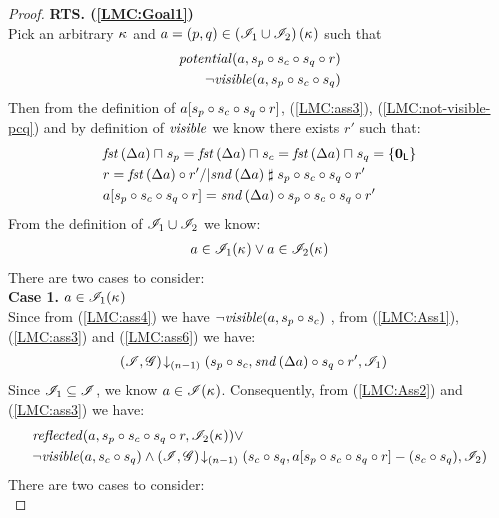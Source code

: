 \begin{lemma}
\begin{proof}
\noindent\textbf{RTS. (\ref{LMC:Goal1})}\\
Pick an arbitrary $\kappa_{}$ and $a = (p, q) \in \left(\mathscr{I}_{1} \cup \mathscr{I}_{2} \right)(\kappa_{})$ such that
\begin{align}
	\mathit{potential}(a, s_p \circ s_c \circ s_q \circ r) \label{LMC:ass3}\\
	\neg\mathit{visible}(a, s_p \circ s_c \circ s_q) \label{LMC:not-visible-pcq}
\end{align}
%
Then from the definition of $a[s_p \circ s_c \circ s_q \circ r]$, (\ref{LMC:ass3}), (\ref{LMC:not-visible-pcq}) and by definition of $\mathit{visible}$ we know there exists $r'$ such that: 
%
\begin{align}
		&\mathit{fst}\left(\Delta {a}\right) \sqcap_{} s_p = \mathit{fst}\left(\Delta {a}\right) \sqcap_{} s_c = \mathit{fst}\left(\Delta {a}\right) \sqcap_{} s_q = \{\mathbf{0}_{\textsf{L}} \} \label{LMC:ass4}\\
		&r = \mathit{fst}\left(\Delta {a}\right) \circ r' /| \mathit{snd}\left(\Delta {a}\right) \mathrel{\sharp} s_p \circ s_c \circ s_q \circ r' \label{LMC:ass5}\\
		&a[s_p \circ s_c \circ s_q \circ r] = \mathit{snd}\left(\Delta {a}\right) \circ s_p \circ s_c \circ s_q \circ r' \label{LMC:ass6}
\end{align}
%
From the definition of $\mathscr{I}_{1} \cup \mathscr{I}_{2}$ we know:
%
\begin{align}
	a \in \mathscr{I}_{1}(\kappa_{}) \lor a \in \mathscr{I}_{2}(\kappa_{}) \nonumber
\end{align}
There are two cases to consider:\\

\noindent\textbf{Case 1.} $a \in \mathscr{I}_{1}(\kappa_{})$\\
Since from  (\ref{LMC:ass4}) we have $\neg\mathit{visible}(a, s_p \circ s_c)$ , from (\ref{LMC:Ass1}),  (\ref{LMC:ass3}) and (\ref{LMC:ass6}) we have: 
%
\begin{align}
	& \left(\mathscr{I}, \mathscr{G}\right) \!\downarrow_{(n-1)} \left(s_{p} \circ s_{c}, \mathit{snd}\left(\Delta {a}\right) \circ  s_q \circ r', \mathscr{I}_1\right) \label{LMC:ass7}
\end{align}
%
Since $\mathscr{I}_{1} \subseteq \mathscr{I}$, we know $a \in \mathscr{I}(\kappa_{})$. Consequently, from (\ref{LMC:Ass2}) and (\ref{LMC:ass3}) we have:
\begin{align*}
	&\mathit{reflected}(a, s_p \circ s_c \circ s_q \circ r, \mathscr{I}_{2}(\kappa_{})) \lor \\
	&\neg\mathit{visible}(a, s_c \circ s_q) \land  \left(\mathscr{I}, \mathscr{G}\right) \!\downarrow_{(n-1)} \left(s_c \circ s_q, a[s_p \circ s_c \circ s_q \circ r]-(s_c \circ s_q), \mathscr{I}_2\right)
\end{align*}
%
There are two cases to consider:\\


\end{proof}
\end{lemma}
